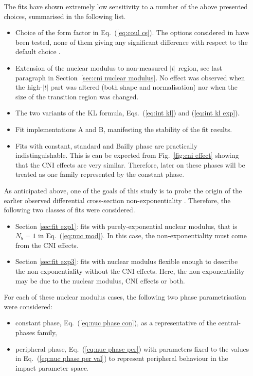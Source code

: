 The fits have shown extremely low sensitivity to a number of the above presented choices, summarised in the following list. 
\begin{itemize}
\item Choice of the form factor in Eq.~(\ref{eq:coul cs}). The options considered in \cite{elegent} have been tested, none of them giving any significant difference with respect to the default choice \cite{puckett10}.
\item Extension of the nuclear modulus to non-measured $|t|$ region, see last paragraph in Section~\ref{sec:cni nuclear modulus}. No effect was observed when the high-$|t|$ part was altered (both shape and normalisation) nor when the size of the transition region was changed.
\item The two variants of the KL formula, Eqs.~(\ref{eq:int kl}) and (\ref{eq:int kl exp}).
\item Fit implementations A and B, manifesting the stability of the fit results.
\item Fits with constant, standard and Bailly phase are practically indistinguishable. This is can be expected from Fig.~\ref{fig:cni effect} showing that the CNI effects are very similar. Therefore, later on these phases will be treated as one family represented by the constant phase.
\end{itemize}


As anticipated above, one of the goals of this study is to probe the origin of the earlier observed differential cross-section non-exponentiality \cite{8tev-90m}. Therefore, the following two classes of fits were considered.
\begin{itemize}
\item Section \ref{sec:fit exp1}: fits with purely-exponential nuclear modulus, that is $N_b=1$ in Eq.~(\ref{eq:nuc mod}). In this case, the non-exponentiality must come from the CNI effects.
\item Section \ref{sec:fit exp3}: fits with nuclear modulus flexible enough to describe the non-exponentiality without the CNI effects. Here, the non-exponentiality may be due to the nuclear modulus, CNI effects or both.
\end{itemize}
For each of these nuclear modulus cases, the following two phase parametrisation were considered:
\begin{itemize}\setlength\itemsep{0pt}
\item constant phase, Eq.~(\ref{eq:nuc phase con}), as a representative of the central-phases family,
\item peripheral phase, Eq.~(\ref{eq:nuc phase per}) with parameters fixed to the values in Eq.~(\ref{eq:nuc phase per val}) to represent peripheral behaviour in the impact parameter space.
\end{itemize}

